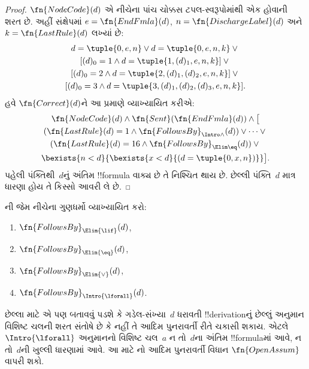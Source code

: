 \documentclass[../../../include/open-logic-section]{subfiles}
\begin{document}
\begin{proof}
  $\fn{NodeCode}(d)$ એ નીચેના પાંચ ચોક્કસ
  ટપલ-સ્વરૂપોમાંથી એક હોવાની શરત છે. અહીં સંક્ષેપમાં
  $e=\fn{EndFmla}(d)$, $n=\fn{DischargeLabel}(d)$ અને
  $k=\fn{LastRule}(d)$ લખ્યાં છે:
  \begin{multline*}
    d=\tuple{0,e,n} \lor d=\tuple{0,e,n,k} \lor {}\\
    [(d)_0=1 \land d=\tuple{1,(d)_1,e,n,k}] \lor {}\\
    [(d)_0=2 \land d=\tuple{2,(d)_1,(d)_2,e,n,k}] \lor {}\\
    [(d)_0=3 \land d=\tuple{3,(d)_1,(d)_2,(d)_3,e,n,k}].
  \end{multline*}
  હવે $\fn{Correct}(d)$ને આ પ્રમાણે
  વ્યાખ્યાયિત કરીએ:
  \begin{multline*}
    \fn{NodeCode}(d) \land \fn{Sent}(\fn{EndFmla}(d)) \land \bigl[{}\\
    (\fn{LastRule}(d) = 1 \land
    \fn{FollowsBy}_{\Intro\land}(d)) \lor \dots \lor {}\\
    (\fn{LastRule}(d) = 16 \land \fn{FollowsBy}_{\Elim\eq}(d)) \lor {}\\
    \bexists{n<d}{\bexists{x<d}{(d = \tuple{0, x, n})}}\bigr].
  \end{multline*}
  પહેલી પંક્તિથી~$d$નું અંતિમ
  !!{formula} વાક્ય છે તે નિશ્ચિત
  થાય છે. છેલ્લી પંક્તિ~$d$
  માત્ર ધારણા હોય તે કિસ્સો આવરી લે છે.
\end{proof}

\begin{prob}
  ની
  જેમ નીચેના ગુણધર્મો વ્યાખ્યાયિત કરો:
  \begin{enumerate}
  \item $\fn{FollowsBy}_{\Elim{\lif}}(d)$,
  \item $\fn{FollowsBy}_{\Elim{\eq}}(d)$,
  \item $\fn{FollowsBy}_{\Elim{\lor}}(d)$,
  \item $\fn{FollowsBy}_{\Intro{\lforall}}(d)$.
  \end{enumerate}
  છેલ્લા માટે એ પણ બતાવવું પડશે કે
  ગડેલ-સંખ્યા~$d$ ધરાવતી
  !!{derivation}નું છેલ્લું અનુમાન
  વિશિષ્ટ ચલની શરત સંતોષે છે કે નહીં
  તે આદિમ પુનરાવર્તી રીતે ચકાસી શકાય.
  એટલે $\Intro{\lforall}$ અનુમાનનો
  વિશિષ્ટ ચલ~$a$ ન તો~$d$ના
  અંતિમ !!{formula}માં આવે, ન તો~$d$ની
  ખુલ્લી ધારણામાં આવે. આ માટે
  નો
  આદિમ પુનરાવર્તી વિધાન
  $\fn{OpenAssum}$ વાપરી શકો.
\end{prob}
\end{document}
